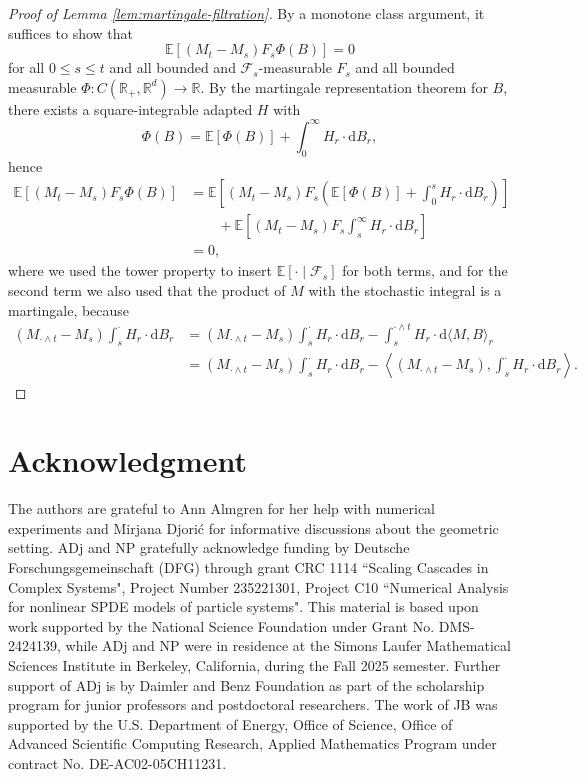 \documentclass[11pt, a4paper]{article}
\newcommand{\mathd}{\mathrm{d}}
\begin{document}
\begin{proof}[Proof of Lemma \ref{lem:martingale-filtration}]
  By a monotone class argument, it suffices to show that
  \[ \mathbb{E} [(M_t - M_s) F_s \Phi (B)] = 0 \]
  for all $0 \leq s \leq t$ and all bounded and
  $\mathcal{F}_s$-measurable $F_s$ and all bounded measurable $\Phi : C
  (\mathbb{R}_+, \mathbb{R}^d) \rightarrow \mathbb{R}$. By the martingale
  representation theorem for $B$, there exists a square-integrable adapted $H$ with
  \[
    \Phi (B) =\mathbb{E} [\Phi (B)] +
  \int_0^{\infty} H_r \cdot \mathd B_r,
  \]
  hence
  \begin{align*}
    \mathbb{E} [(M_t - M_s) F_s \Phi (B)] & = \mathbb{E} \left[ (M_t - M_s)
    F_s \left( \mathbb{E} [\Phi (B)] + \int_0^s H_r \cdot \mathd B_r \right)
    \right] \\
    &\qquad +\mathbb{E} \left[ (M_t - M_s) F_s \int_s^{\infty} H_r \cdot
    \mathd B_r \right]\\
    & = 0,
  \end{align*}
  where we used the tower property to insert $\mathbb{E} [\cdot
  \mid\mathcal{F}_s]$ for both terms, and for the second term we also used that the product of $M$ with the stochastic integral is a martingale, because
  \begin{align*}
    (M_{\cdot \wedge t} - M_s) \int_s^{\cdot} H_r \cdot \mathd B_r & =
    (M_{\cdot \wedge t} - M_s) \int_s^{\cdot} H_r \cdot \mathd B_r -
    \int_s^{\cdot \wedge t} H_r \cdot \mathd \langle M, B \rangle_r\\
    & = (M_{\cdot \wedge t} - M_s) \int_s^{\cdot} H_r \cdot \mathd
    B_r - \left\langle (M_{\cdot \wedge t} - M_s), \int_s^{\cdot} H_r
    \cdot \mathd B_r \right\rangle.
  \end{align*}
\end{proof}

\section*{Acknowledgment}
The authors are grateful to Ann Almgren for her help with numerical experiments and Mirjana Djori\' c for informative discussions about the geometric setting.
ADj and NP gratefully acknowledge funding   by Deutsche Forschungsgemeinschaft (DFG)  through grant CRC 1114 ``Scaling Cascades in Complex Systems", Project Number 235221301, Project C10 ``Numerical
Analysis for nonlinear SPDE models of particle systems". This material is based upon work supported by the National Science Foundation under Grant No. DMS-2424139, while ADj and NP were in residence at the Simons Laufer Mathematical Sciences Institute in Berkeley, California, during the Fall 2025 semester. Further support of ADj is by Daimler and Benz Foundation as part of the scholarship program for junior professors and postdoctoral researchers.
The work of JB was supported by the U.S. Department of Energy, Office of Science, Office of Advanced Scientific Computing Research, Applied Mathematics Program under contract No. DE-AC02-05CH11231. 

 
\end{document}
